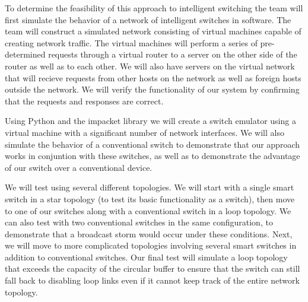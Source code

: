 \documentclass{article}
\begin{document}
	To determine the feasibility of this approach to intelligent switching the team will first simulate the behavior of a network of intelligent switches in software.
	The team will construct a simulated network consisting of virtual machines capable of creating network traffic.
	The virtual machines will perform a series of pre-determined requests through a virtual router to a server on the other side of the router as well as to each other.
	We will also have servers on the virtual network that will recieve requests from other hosts on the network as well as foreign hosts outside the network.
	We will verify the functionality of our system by confirming that the requests and responses are correct.
	
	Using Python and the impacket library we will create a switch emulator using a virtual machine with a significant number of network interfaces.
	We will also simulate the behavior of a conventional switch to demonstrate that our approach works in conjuntion with these switches, as well as to demonstrate the advantage of our switch over a conventional device.
	
	We will test using several different topologies.
	We will start with a single smart switch in a star topology (to test its basic functionality as a switch), then move to one of our switches along with a conventional switch in a loop topology.
	We can also test with two conventional switches in the same configuration, to demonstrate that a broadcast storm would occur under these conditions.
	Next, we will move to more complicated topologies involving several smart switches in addition to conventional switches.
	Our final test will simulate a loop topology that exceeds the capacity of the circular buffer to ensure that the switch can still fall back to disabling loop links even if it cannot keep track of the entire network topology.
\end{document}

